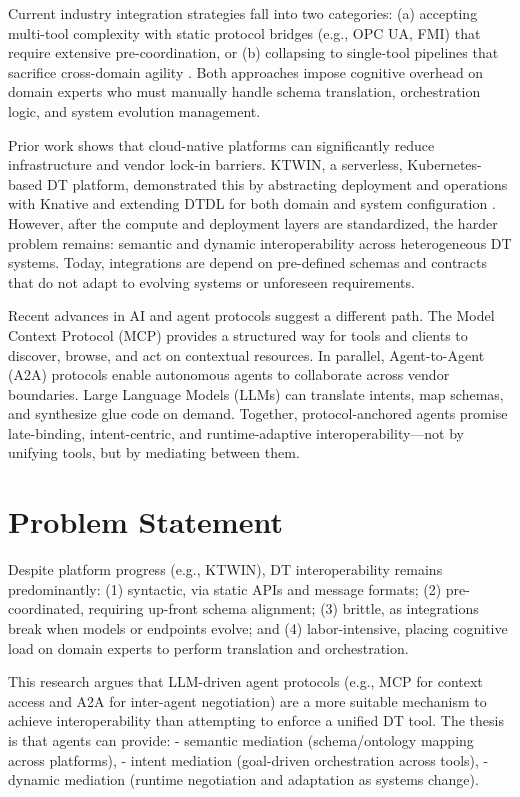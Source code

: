 Current industry integration strategies fall into two categories: (a) accepting multi-tool complexity with static protocol bridges (e.g., OPC UA, FMI) that require extensive pre-coordination, or (b) collapsing to single-tool pipelines that sacrifice cross-domain agility \cite{Muctadir_2024}. Both approaches impose cognitive overhead on domain experts who must manually handle schema translation, orchestration logic, and system evolution management.

Prior work shows that cloud-native platforms can significantly reduce infrastructure and vendor lock-in barriers. KTWIN, a serverless, Kubernetes-based DT platform, demonstrated this by abstracting deployment and operations with Knative and extending DTDL for both domain and system configuration \cite{Wermann_Wickboldt_2025}. However, after the compute and deployment layers are standardized, the harder problem remains: semantic and dynamic interoperability across heterogeneous DT systems. Today, integrations are depend on pre-defined schemas and contracts that do not adapt to evolving systems or unforeseen requirements.

Recent advances in AI and agent protocols suggest a different path. The Model Context Protocol (MCP) provides a structured way for tools and clients to discover, browse, and act on contextual resources. In parallel, Agent-to-Agent (A2A) protocols enable autonomous agents to collaborate across vendor boundaries. Large Language Models (LLMs) can translate intents, map schemas, and synthesize glue code on demand. Together, protocol-anchored agents promise late-binding, intent-centric, and runtime-adaptive interoperability---not by unifying tools, but by mediating between them.

\section{Problem Statement}

Despite platform progress (e.g., KTWIN), DT interoperability remains predominantly:
(1) syntactic, via static APIs and message formats;
(2) pre-coordinated, requiring up-front schema alignment;
(3) brittle, as integrations break when models or endpoints evolve; and
(4) labor-intensive, placing cognitive load on domain experts to perform translation and orchestration.

This research argues that LLM-driven agent protocols (e.g., MCP for context access and A2A for inter-agent negotiation) are a more suitable mechanism to achieve interoperability than attempting to enforce a unified DT tool. The thesis is that agents can provide:
- semantic mediation (schema/ontology mapping across platforms),
- intent mediation (goal-driven orchestration across tools),
- dynamic mediation (runtime negotiation and adaptation as systems change).


